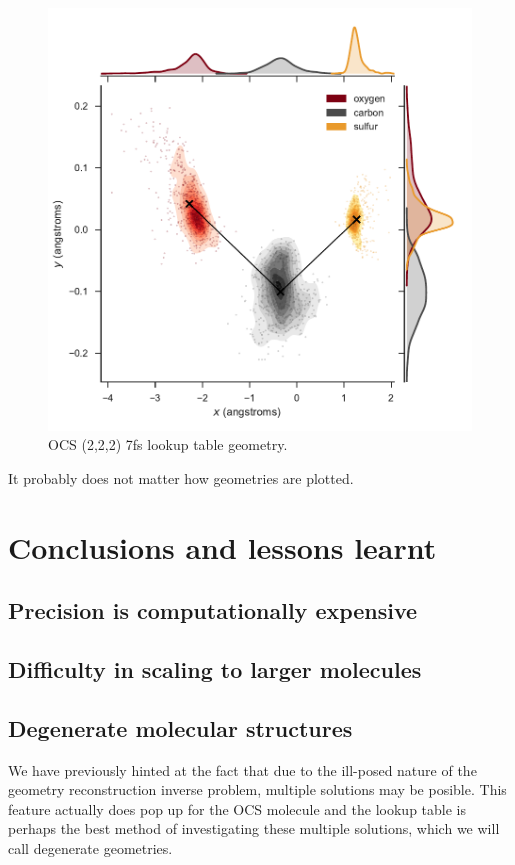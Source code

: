 \pagebreak
\begin{figure}
  \centering
  \includegraphics[width=\textwidth]{Plots/OCS2227fsLTGeometry}
  \caption[OCS (2,2,2) 7fs lookup table geometry.]
  {OCS (2,2,2) 7fs lookup table geometry.}
  \label{fig:OCS2227fsLTGeometry}
\end{figure}

It probably does not matter how geometries are plotted. 

\clearpage

\section{Conclusions and lessons learnt}
\subsection{Precision is computationally expensive}
\subsection{Difficulty in scaling to larger molecules}

\pagebreak
\subsection{Degenerate molecular structures}
We have previously hinted at the fact that due to the ill-posed nature of the geometry reconstruction inverse problem, multiple solutions may be posible. This feature actually does pop up for the OCS molecule and the lookup table is perhaps the best method of investigating these multiple solutions, which we will call degenerate geometries.

